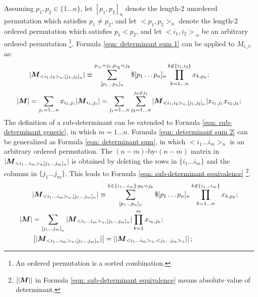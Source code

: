 \documentclass[twoside]{article}
\numberwithin{equation}{section}
\begin{document}
Assuming $p_1, p_{2} \in \{1\dots n\}$, let $[p_1, p_{2}]_n$ denote the length-2 unordered permutation which satisfies $p_1 \neq p_{2}$, and let $<p_1,p_{2}>_n$ denote the length-2 ordered permutation which satisfies $p_1 < p_{2}$, and let ${<i_1,i_2>}_n$ be an arbitrary ordered permutation \footnote{An ordered permutation is a sorted combination.}. 
Formula \eqref{eqn: determinant sum 1} can be applied to $M_{i,j}$, as:
\begin{align}
&|\protect{\textrm{\boldmath $M$}}_{<i_1 ,i_{2}>_n, [j_1 ,j_{2}]_n}| \equiv \sum_{[p_1 \dots p_n]_n}^{p_{i_1}=j_1, p_{i_{2}}=j_{2}} 
    \$ [p_1\dots p_n]_n \prod _{k=1 \dots n}^{k \not \in \{i_1, i_2\}} x_{k,p_{k}}; \\
\label{eqn: determinant sum 2}
|\protect{\textrm{\boldmath $M$}}| &= \sum_{j_1 = 1 \dots n} x_{i_1, j_1} |\protect{\textrm{\boldmath $M$}}_{i_1, j_1}| = 
\sum_{j_1=1 \dots n} \sum_{j_{2}=1 \dots n}^{ j_{2} \ne j_1} |\protect{\textrm{\boldmath $M$}} _{<i_1, i_{2}>_n,  [j_1, j_{2}]_n}| x_{i_1, j_1} x_{i_{2}, j_{2}};
\end{align}
The definition of a sub-determinant can be extended to Formula \eqref{eqn: sub-determinant generic}, in which $m =1...n$.  
Formula \eqref{eqn: determinant sum 2} can be generalized as Formula \eqref{eqn: determinant sum}, in which $<i_1 \dots i_m>_n$ is an arbitrary ordered permutation. 
The $(n-m)$-by-$(n-m)$ matrix in $|\protect{\textrm{\boldmath $M$}}_{<i_1 \dots i_m>_n[j_1 \dots j_m]_n}|$ is obtained by deleting the rows in $\{i_1 \dots i_m\}$ and the columns in $\{j_1 \dots j_m\}$.
This leads to Formula \eqref{eqn: sub-determinant equivalence} \footnote{$\left| |\protect{\textrm{\boldmath $M$}}| \right|$ in Formula \eqref{eqn: sub-determinant equivalence} means absolute value of determinant.}.
\begin{align}
\label{eqn: sub-determinant generic}
&|\protect{\textrm{\boldmath $M$}}_{<i_1 \dots i_m>_n, [j_1 \dots j_m]_n}| \equiv \sum_{[p_1 \dots p_n]_n}^{k \in \{i_1 \dots i_m\}: p_k=j_k} \$ [p_1\dots p_n]_n 
	\prod_{k = 1 \dots n }^{k \not \in \{i_1 \dots i_m\}} x_{k,p_{k}}; \\
\label{eqn: determinant sum}
|\protect{\textrm{\boldmath $M$}}| &= \sum_{{[j_1 \dots j_m]}_n} |\protect{\textrm{\boldmath $M$}} _{<i_1 \dots i_m>_n, [j_1 \dots j_m]_n}| \prod_{k=1}^{m} x_{i_k, j_k}; \\
\label{eqn: sub-determinant equivalence}
&\left| |\protect{\textrm{\boldmath $M$}}_{<i_1 \dots i_m>_n, [j_1 \dots j_m]_n}| \right| = \left| |\protect{\textrm{\boldmath $M$}}_{<i_1 \dots i_m>_n, <j_1 \dots j_m>_n}| \right|;
\end{align}
\end{document}
